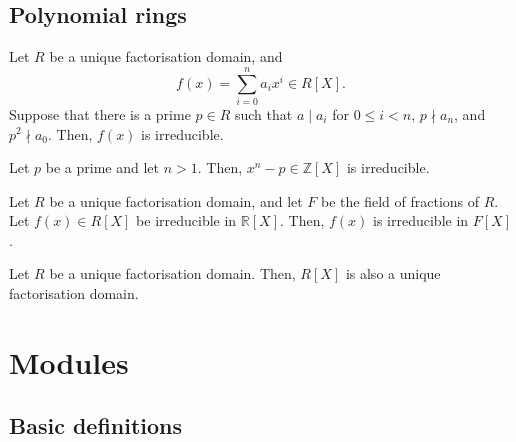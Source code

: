\documentclass[11pt]{article}
\newcommand{\R}{\mathbb{R}}
\newcommand{\Z}{\mathbb{Z}}
\theoremstyle{definition}
\theoremstyle{remark}
\numberwithin{equation}{section}
\begin{document}
    \subsection{Polynomial rings}
    
    \begin{theorem}
        Let $R$ be a unique factorisation domain, and \[
            f(x) = \sum_{i = 0}^n a_ix^i \in R[X].
        \] Suppose that there is a prime $p \in R$ such that $a\mid a_i$ for $0 \leq
        i < n$, $p\nmid a_n$, and $p^2 \nmid a_0$. Then, $f(x)$ is irreducible.
    \end{theorem}
    \begin{corollary}
        Let $p$ be a prime and let $n > 1$. Then, $x^n - p \in \Z[X]$ is irreducible.
    \end{corollary}

    \begin{lemma}
        Let $R$ be a unique factorisation domain, and let $F$ be the field of
        fractions of $R$. Let $f(x) \in R[X]$ be irreducible in $\R[X]$. Then, $f(x)$
        is irreducible in $F[X]$.
    \end{lemma}

    \begin{theorem}
        Let $R$ be a unique factorisation domain. Then, $R[X]$ is also a unique
        factorisation domain.
    \end{theorem}




    \section{Modules}
    
    \subsection{Basic definitions}
\end{document}
